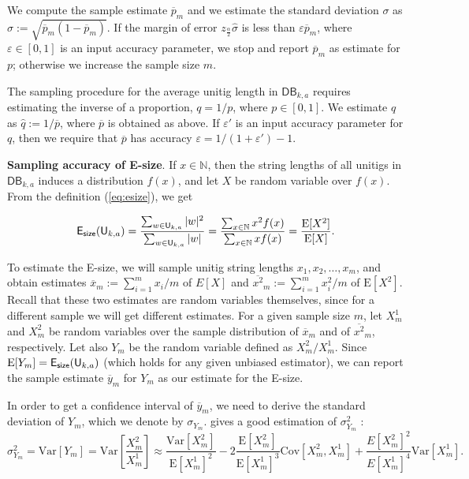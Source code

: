 \documentclass[a4paper,11pt]{article}
\newcommand{\kristoffer}[1]{{\color{red}{#1}}}
\newcommand{\DB}{\mathsf{DB}_{k,a}}
\newcommand{\U}{\mathsf{U}_{k,a}}
\newcommand{\esize}{{\sf E_{size}}}
\newcommand{\Var}{\text{Var}}
\newcommand{\Cov}{\text{Cov}}
\newcommand{\E}{\text{E}}
\begin{document}
We compute the sample estimate $\overline{p}_m$ and we estimate the standard deviation $\sigma$ as $\hat{\sigma} := \sqrt{\overline{p}_m(1-\overline{p}_m)}$. If the margin of error $z_{\frac{\alpha}{2}}\hat{\sigma}$ is less than $\varepsilon \overline{p}_m$, where $\varepsilon \in [0,1]$ is an input accuracy parameter, we stop and report $\overline{p}_m$ as estimate for $p$; otherwise we increase the sample size $m$.

The sampling procedure for the average unitig length in $\DB$ requires estimating the inverse of a proportion, $q = 1/p$, where $p \in [0,1]$. We estimate $q$ as $\hat{q} := 1/\overline{p}$, where $\overline{p}$ is obtained as above. If $\varepsilon'$ is an input accuracy parameter for $q$, then we require that $\overline{p}$ has accuracy $\varepsilon = 1/(1+\varepsilon') - 1$. \kristoffer{I stop here with the note that I have to clarify the last part in this section (i.e f=1/p) a bit. Also, we need to illustrate how it works in practice (inital estimate, then updating sample size as we go for a fixed epsilon= say 0.05)}


\medskip
\noindent\textbf{Sampling accuracy of E-size}. If $x \in \mathbb{N}$, then the string lengths of all unitigs in $\DB$ induces a distribution $f(x)$, and let $X$ be random variable over $f(x)$. From the definition (\ref{eq:esize}), we get

\[\esize(\U) = \frac{\sum_{w \in \U}|w|^2}{\sum_{w \in \U}|w|} = \frac{\sum_{x \in \mathbb{N}} x^2 f(x)}{\sum_{x \in \mathbb{N}} xf(x)} =  \frac{\E[X^2]}{\E[X]}.\]

To estimate the E-size, we will sample unitig string lengths $x_1,x_2,\dots,x_m$, and obtain estimates $\overline{x}_m := \sum_{i=1}^{m} x_i/m$ of $E[X]$ and $\overline{x^2}_m := \sum_{i=1}^{m} x_i^2/m$ of $\E[X^2]$. Recall that these two estimates are random variables themselves, since for a different sample we will get different estimates. For a given sample size $m$, let $X^1_{m}$ and $X^2_{m}$ be random variables over the sample distribution of $\overline{x}_m$ and of $\overline{x^2}_m$, respectively. Let also $Y_m$ be the random variable defined as $X^2_m/X^1_m$. Since $\E[Y_m] = \esize(\U)$ (which holds for any given unbiased estimator), we can report the sample estimate $\overline{y}_m$ for $Y_m$ as our estimate for the E-size. 

In order to get a confidence interval of $\overline{y}_m$, we need to derive the standard deviation of $Y_m$, which we denote by $\sigma_{Y_m}$. \kristoffer{If ... is ..., then the first order Taylor expansion} gives a good estimation of $\sigma_{Y_m}^2$ \cite{Benaroya:2005aa}:
\[\sigma_{Y_m}^2 = \Var\left[Y_m\right] = \Var\left[\frac{X^2_m}{X^1_m}\right] \approx \frac{\Var\left[X^2_m\right]}{\E\left[X^1_m\right]^2} -2\frac{\E\left[X^2_m\right]}{\E\left[X^1_m\right]^3}\Cov\left[X^2_m,X^1_m\right] + \frac{E\left[X^2_m\right]^2}{E\left[X^1_m\right]^4}\Var\left[X^1_m\right].\] 
\end{document}
